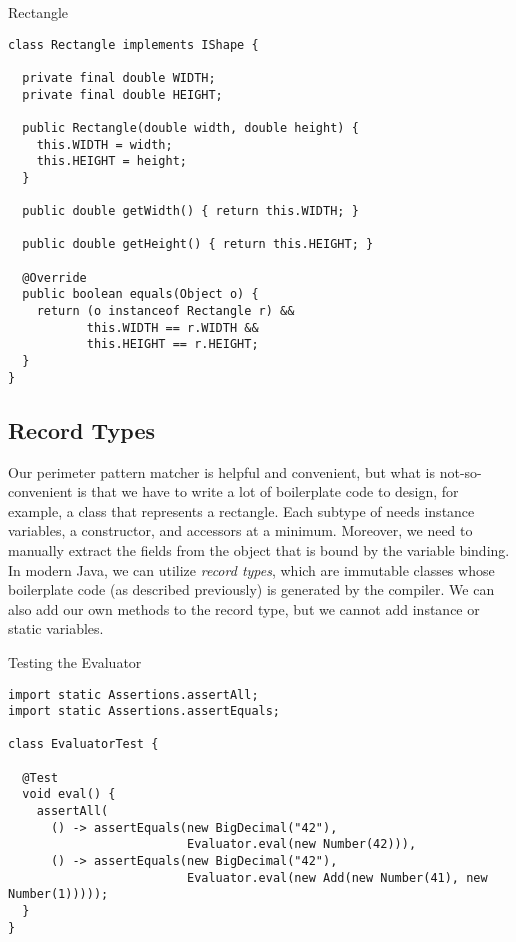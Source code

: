 \begin{cl}[]{Rectangle}
\begin{lstlisting}[language=MyJava]
class Rectangle implements IShape {

  private final double WIDTH;
  private final double HEIGHT;

  public Rectangle(double width, double height) {
    this.WIDTH = width;
    this.HEIGHT = height;
  }

  public double getWidth() { return this.WIDTH; }

  public double getHeight() { return this.HEIGHT; }

  @Override
  public boolean equals(Object o) {
    return (o instanceof Rectangle r) &&
           this.WIDTH == r.WIDTH &&
           this.HEIGHT == r.HEIGHT;
  }
}
\end{lstlisting}
\end{cl}


\subsection*{Record Types}

Our perimeter pattern matcher is helpful and convenient, but what is not-so-convenient is that we have to write a lot of boilerplate code to design, for example, a class that represents a rectangle. Each subtype of  needs instance variables, a constructor, and accessors at a minimum. Moreover, we need to manually extract the fields from the object that is bound by the variable binding. In modern Java, we can utilize \textit{record types}, which are immutable classes whose boilerplate code (as described previously) is generated by the compiler. We can also add our own methods to the record type, but we cannot add instance or static variables.


\begin{cl}[]{Testing the Evaluator}
\begin{lstlisting}[language=MyJava]
import static Assertions.assertAll;
import static Assertions.assertEquals;

class EvaluatorTest {

  @Test
  void eval() {
    assertAll(
      () -> assertEquals(new BigDecimal("42"),
                         Evaluator.eval(new Number(42))),
      () -> assertEquals(new BigDecimal("42"),
                         Evaluator.eval(new Add(new Number(41), new Number(1)))));
  }
}
\end{lstlisting}
\end{cl}

